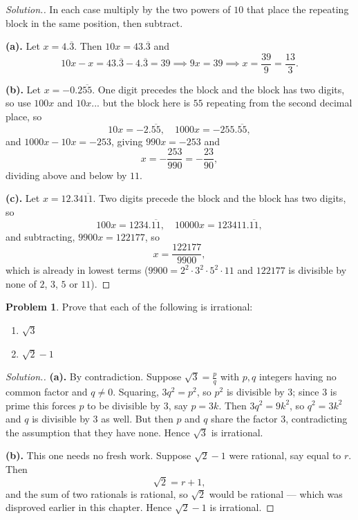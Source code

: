 \documentclass[11pt,a4paper]{article}
\theoremstyle{definition}
\newtheorem{problemx}{Problem}[section]
\newenvironment{problem}{\begin{problemx}}{\end{problemx}}
\newenvironment{solution}
  {\renewcommand{\qedsymbol}{}\begin{proof}[\textit{Solution}.]}
  {\end{proof}}
\begin{document}
\begin{solution}
In each case multiply by the two powers of $10$ that place the repeating block in
the same position, then subtract.

\textbf{(a).} Let $x=4.\overline{3}$. Then $10x=43.\overline{3}$ and
$$10x-x=43.\overline{3}-4.\overline{3}=39
\implies 9x=39 \implies x=\frac{39}{9}=\frac{13}{3}.$$

\textbf{(b).} Let $x=-0.2\overline{55}$. One digit precedes the block and the block
has two digits, so use $100x$ and $10x$... but the block here is $55$ repeating
from the second decimal place, so
$$10x=-2.\overline{55},\quad 1000x=-255.\overline{55},$$
and $1000x-10x=-253$, giving $990x=-253$ and
$$x=-\frac{253}{990}=-\frac{23}{90},$$
dividing above and below by $11$.

\textbf{(c).} Let $x=12.34\overline{11}$. Two digits precede the block and the block
has two digits, so
$$100x=1234.\overline{11},\quad 10000x=123411.\overline{11},$$
and subtracting, $9900x=122177$, so
$$x=\frac{122177}{9900},$$
which is already in lowest terms ($9900=2^{2}\cdot 3^{2}\cdot 5^{2}\cdot 11$ and
$122177$ is divisible by none of $2$, $3$, $5$ or $11$).
\end{solution}

\begin{problem}
Prove that each of the following is irrational:
\begin{enumerate}
\item[(a).] $\sqrt{3}$
\item[(b).] $\sqrt{2}-1$
\end{enumerate}
\end{problem}

\begin{solution}
\textbf{(a).} By contradiction. Suppose $\sqrt{3}=\frac{p}{q}$ with $p,q$ integers
having no common factor and $q\neq 0$. Squaring, $3q^{2}=p^{2}$, so $p^{2}$ is
divisible by $3$; since $3$ is prime this forces $p$ to be divisible by $3$, say
$p=3k$. Then $3q^{2}=9k^{2}$, so $q^{2}=3k^{2}$ and $q$ is divisible by $3$ as
well. But then $p$ and $q$ share the factor $3$, contradicting the assumption that
they have none. Hence $\sqrt{3}$ is irrational.

\textbf{(b).} This one needs no fresh work. Suppose $\sqrt{2}-1$ were rational,
say equal to $r$. Then
$$\sqrt{2}=r+1,$$
and the sum of two rationals is rational, so $\sqrt{2}$ would be rational --- which
was disproved earlier in this chapter. Hence $\sqrt{2}-1$ is irrational.
\end{solution}
\end{document}
